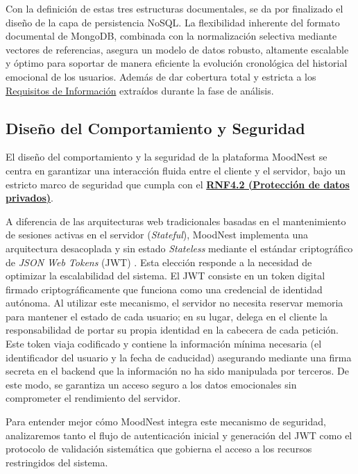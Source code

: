 Con la definición de estas tres estructuras documentales, se da por finalizado el diseño de la capa de persistencia NoSQL. La flexibilidad inherente del formato documental de MongoDB, combinada con la normalización selectiva mediante vectores de referencias, asegura un modelo de datos robusto, altamente escalable y óptimo para soportar de manera eficiente la evolución cronológica del historial emocional de los usuarios. Además de dar cobertura total y estricta a los \hyperref[tab:ri_total]{Requisitos de Información} extraídos durante la fase de análisis.

\newpage



\subsection{Diseño del Comportamiento y Seguridad}
\label{sec:seguridad}

El diseño del comportamiento y la seguridad de la plataforma MoodNest se centra en garantizar una interacción fluida entre el cliente y el servidor, bajo un estricto marco de seguridad que cumpla con el \hyperref[tab:rnf_total]{\textbf{RNF4.2 (Protección de datos privados)}}.

A diferencia de las arquitecturas web tradicionales basadas en el mantenimiento de sesiones activas en el servidor (\textit{Stateful}), MoodNest implementa una arquitectura desacoplada y sin estado \textit{Stateless} mediante el estándar criptográfico de \textit{JSON Web Tokens} (JWT) \cite{bib:jwt}. Esta elección responde a la necesidad de optimizar la escalabilidad del sistema. El JWT consiste en un token digital firmado criptográficamente que funciona como una credencial de identidad autónoma. Al utilizar este mecanismo, el servidor no necesita reservar memoria para mantener el estado de cada usuario; en su lugar, delega en el cliente la responsabilidad de portar su propia identidad en la cabecera de cada petición. Este token viaja codificado y contiene la información mínima necesaria (el identificador del usuario y la fecha de caducidad) asegurando mediante una firma secreta en el backend que la información no ha sido manipulada por terceros. De este modo, se garantiza un acceso seguro a los datos emocionales sin comprometer el rendimiento del servidor.

Para entender mejor cómo MoodNest integra este mecanismo de seguridad, analizaremos tanto el flujo de autenticación inicial y generación del JWT como el protocolo de validación sistemática que gobierna el acceso a los recursos restringidos del sistema. 


